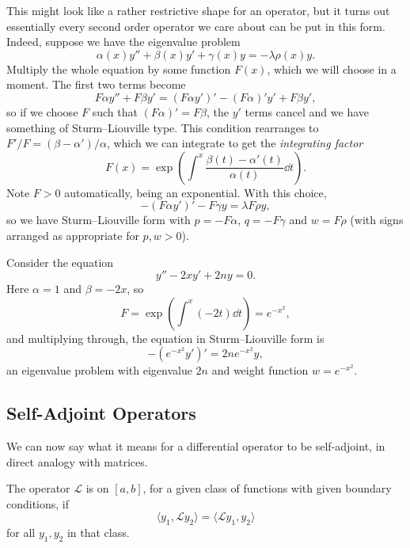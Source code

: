 This might look like a rather restrictive shape for an operator, but it turns out essentially every second order operator we care about can be put in this form.
Indeed, suppose we have the eigenvalue problem
$$
\alpha(x) y'' + \beta(x) y' + \gamma(x) y = -\lambda \rho(x) y.
$$
Multiply the whole equation by some function $F(x)$, which we will choose in a moment. The first two terms become
$$
F \alpha y'' + F \beta y' = (F \alpha y')' - (F\alpha)' y' + F \beta y',
$$
so if we choose $F$ such that $(F \alpha)' = F \beta$, the $y'$ terms cancel and we have something of Sturm--Liouville type.
This condition rearranges to $F'/F = (\beta - \alpha')/\alpha$, which we can integrate to get the \emph{integrating factor}
$$
F(x) = \exp\left(\int^x \frac{\beta(t) - \alpha'(t)}{\alpha(t)} \dd t\right).
$$
Note $F > 0$ automatically, being an exponential. With this choice,
$$
-(F \alpha y')' - F \gamma y = \lambda F \rho y,
$$
so we have Sturm--Liouville form with $p = -F\alpha$, $q = -F \gamma$ and $w = F \rho$ (with signs arranged as appropriate for $p, w > 0$).

\begin{example}
    Consider the equation
    $$
    y'' - 2x y' + 2n y = 0.
    $$
    Here $\alpha = 1$ and $\beta = -2x$, so
    $$
    F = \exp \left(\int^x (-2t) \dd t\right) = e^{-x^2},
    $$
    and multiplying through, the equation in Sturm--Liouville form is
    $$
    -\left(e^{-x^2} y'\right)' = 2n e^{-x^2} y,
    $$
    an eigenvalue problem with eigenvalue $2n$ and weight function $w = e^{-x^2}$.
\end{example}

\subsection{Self-Adjoint Operators}

We can now say what it means for a differential operator to be self-adjoint, in direct analogy with matrices.

\begin{definition}
    The operator $\mathcal{L}$ is  on $[a, b]$, for a given class of functions with given boundary conditions, if
    $$
    \langle y_1, \mathcal{L} y_2 \rangle = \langle \mathcal{L} y_1, y_2\rangle
    $$
    for all $y_1, y_2$ in that class.
\end{definition}

